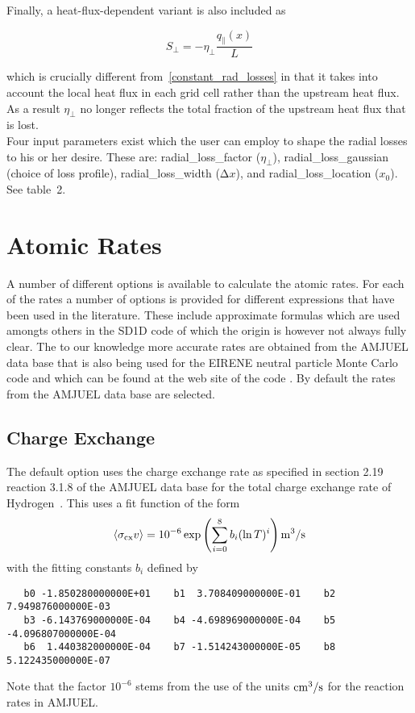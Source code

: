 \documentclass[amsmath,amssymb,a4]{revtex4-2}
\begin{document}
Finally, a heat-flux-dependent variant is also included as

\begin{equation}
S_{\perp}=-\eta_{\perp}\frac{q_\parallel(x)}{L}
\end{equation}

which is crucially different from~\ref{constant_rad_losses} in that it takes into account the local heat flux in each grid cell rather than the upstream heat flux. As a result $\eta_{\perp}$ no longer reflects the total fraction of the upstream heat flux that is lost.\\

Four input parameters exist which the user can employ to shape the radial losses to his or her desire. These are:
radial\_loss\_factor ($\eta_{\perp}$),
radial\_loss\_gaussian (choice of loss profile),
radial\_loss\_width ($\mathrm{\Delta}x$), and
radial\_loss\_location ($x_0$). See table~2.

\section{Atomic Rates}\label{rates}

A number of different options is available to calculate the atomic rates. For each of the rates a number of options is provided for different expressions that have been used in the literature. These include approximate formulas which are used amongts others in the SD1D code \cite{SD1D} of which the origin is however not always fully clear. The to our knowledge more accurate rates are obtained from the AMJUEL data base that is also being used for the EIRENE neutral particle Monte Carlo code and which can be found at the web site of the code \cite{EIRENE}. By default the rates from the AMJUEL data base are selected.


\subsection{Charge Exchange}

The default option uses the charge exchange rate as specified in section 2.19 reaction 3.1.8 of the AMJUEL data base for the total charge exchange rate of Hydrogen~\cite{EIRENE}. This uses a fit function of the form
\begin{equation}\label{charge_exchange_AMJUEL}
    \langle\sigma_{\rm cx} v\rangle = 10^{-6} \exp\left( \sum_{i=0}^8 b_i (\ln T)^i \right)  {\rm m}^3/{\rm s}
\end{equation}
with the fitting constants $b_i$ defined by
\begin{small}\begin{verbatim}
   b0 -1.850280000000E+01    b1  3.708409000000E-01    b2  7.949876000000E-03
   b3 -6.143769000000E-04    b4 -4.698969000000E-04    b5 -4.096807000000E-04
   b6  1.440382000000E-04    b7 -1.514243000000E-05    b8  5.122435000000E-07
\end{verbatim}\end{small}
Note that the factor $10^{-6}$ stems from the use of the units ${\rm cm}^3/{\rm s}$ for the reaction rates in AMJUEL.
\end{document}
